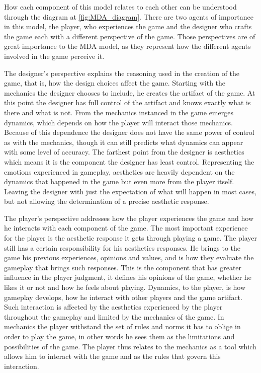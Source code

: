 

How each component of this model relates to each other can be understood through the diagram at \autoref{fig:MDA_diagram}. There are two agents of importance in this model, the player, who experiences the game and the designer who crafts the game each with a different perspective of the game. Those perspectives are of great importance to the MDA model, as they represent how the different agents involved in the game perceive it. 

The designer's perspective explains the reasoning used in the creation of the game, that is, how the design choices affect the game. Starting with the mechanics the designer chooses to include, he creates the artifact of the game. At this point the designer has full control of the artifact and knows exactly what is there and what is not. From the mechanics instanced in the game emerges dynamics, which depends on how the player will interact those mechanics. Because of this dependence the designer does not have the same power of control as with the mechanics, though it can still predicts what dynamics can appear with some level of accuracy. The farthest point from the designer is aesthetics which means it is the component the designer has least control. Representing the emotions experienced in gameplay, aesthetics are heavily dependent on the dynamics that happened in the game but even more from the player itself. Leaving the designer with just the expectation of what will happen in most cases, but not allowing the determination of a precise aesthetic response. 

The player's perspective addresses how the player experiences the game and how he interacts with each component of the game. The most important experience for the player is the aesthetic response it gets through playing a game. The player still has a certain responsibility for his aesthetics responses. He brings to the game his previous experiences, opinions and values, and is how they evaluate the gameplay that brings such responses. This is the component that has greater influence in the player judgment, it defines his opinions of the game, whether he likes it or not and how he feels about playing. Dynamics, to the player, is how gameplay develops, how he interact with other players and the game artifact. Such interaction is affected by the aesthetics experienced by the player throughout the gameplay and limited by the mechanics of the game. In mechanics the player withstand the set of rules and norms it has to oblige in order to play the game, in other words he sees them as the limitations and possibilities of the game. The player thus relates to the mechanics as a tool which allows him to interact with the game and as the rules that govern this interaction. 

